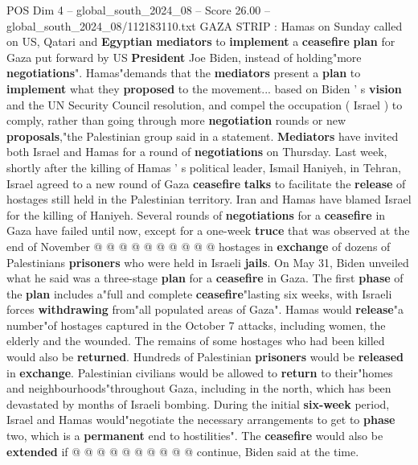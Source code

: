 \begin{textsample}{POS Dim 4 – global\_south\_2024\_08 – Score 26.00 – global\_south\_2024\_08/112183110.txt}  \label{ex:f4_pos_121}
GAZA STRIP : Hamas on Sunday called on US, Qatari and \textbf{Egyptian} \textbf{mediators} to \textbf{implement} a \textbf{ceasefire} \textbf{plan} for Gaza put forward by US \textbf{President} Joe Biden, instead of holding"more \textbf{negotiations}".
Hamas"demands that the \textbf{mediators} present a \textbf{plan} to \textbf{implement} what they \textbf{proposed} to the movement... based on Biden ' s \textbf{vision} and the UN Security Council resolution, and compel the occupation ( Israel ) to comply, rather than going through more \textbf{negotiation} rounds or new \textbf{proposals},"the Palestinian group said in a statement. \textbf{Mediators} have invited both Israel and Hamas for a round of \textbf{negotiations} on Thursday.
Last week, shortly after the killing of Hamas ' s political leader, Ismail Haniyeh, in Tehran, Israel agreed to a new round of Gaza \textbf{ceasefire} \textbf{talks} to facilitate the \textbf{release} of hostages still held in the Palestinian territory.
Iran and Hamas have blamed Israel for the killing of Haniyeh.
Several rounds of \textbf{negotiations} for a \textbf{ceasefire} in Gaza have failed until now, except for a one-week \textbf{truce} that was observed at the end of November @ @ @ @ @ @ @ @ @ @ hostages in \textbf{exchange} of dozens of Palestinians \textbf{prisoners} who were held in Israeli \textbf{jails}.
On May 31, Biden unveiled what he said was a three-stage \textbf{plan} for a \textbf{ceasefire} in Gaza.
The first \textbf{phase} of the \textbf{plan} includes a"full and complete \textbf{ceasefire}"lasting six weeks, with Israeli forces \textbf{withdrawing} from"all populated areas of Gaza".
Hamas would \textbf{release}"a number"of hostages captured in the October 7 attacks, including women, the elderly and the wounded.
The remains of some hostages who had been killed would also be \textbf{returned}.
Hundreds of Palestinian \textbf{prisoners} would be \textbf{released} in \textbf{exchange}.
Palestinian civilians would be allowed to \textbf{return} to their"homes and neighbourhoods"throughout Gaza, including in the north, which has been devastated by months of Israeli bombing.
During the initial \textbf{six-week} period, Israel and Hamas would"negotiate the necessary arrangements to get to \textbf{phase} two, which is a \textbf{permanent} end to hostilities".
The \textbf{ceasefire} would also be \textbf{extended} if @ @ @ @ @ @ @ @ @ @ continue, Biden said at the time.

\end{textsample}
